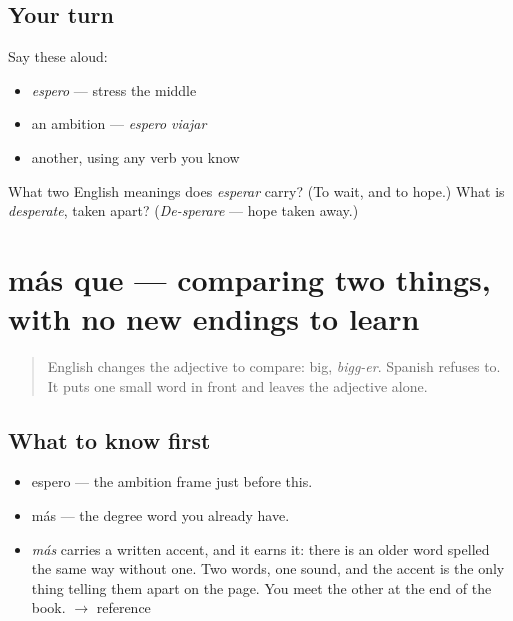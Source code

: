 \subsection*{Your turn}
Say these aloud:

\begin{itemize}
\raggedright
  \item \emph{espero} — stress the middle
  \item an ambition — \emph{espero viajar}
  \item another, using any verb you know
\end{itemize}

\begin{tcolorbox}[breakable,colback=teal!4,colframe=teal!35!black,title={Before you move on}]
What two English meanings does \emph{esperar} carry? (To wait, and to hope.) What is \emph{desperate}, taken apart? (\emph{De-sperare} — hope taken away.)
\end{tcolorbox}
\section[más que]{más que — comparing two things, with no new endings to learn}

\label{lesson:ES-C269-mas-que}



\begin{quote}
English changes the adjective to compare: big, \emph{bigg-er}. Spanish refuses to. It puts one small word in front and leaves the adjective alone.
\end{quote}

\subsection*{What to know first}
\begin{itemize}
\raggedright
  \item espero — the ambition frame just before this.
  \item más — the degree word you already have.
\end{itemize}

\begin{sounds}
\begin{itemize}
\raggedright
  \item \emph{más} carries a written accent, and it earns it: there is an older word spelled the same way without one. Two words, one sound, and the accent is the only thing telling them apart on the page. You meet the other at the end of the book. $\to$ reference
\end{itemize}
\end{sounds}

